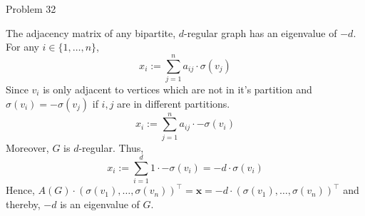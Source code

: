 \documentclass[a4paper]{article}
\begin{document}
\begin{solution}{Problem 32}
\begin{theorem}{The adjacency matrix of any bipartite, $d$-regular graph has an eigenvalue of $-d$.}
For any $i \in \{1, \dots, n\}$,
\begin{equation*}
	x_i := \sum_{j=1}^n a_{ij} \cdot \sigma(v_j)
\end{equation*}
Since $v_i$ is only adjacent to vertices which are not in it's partition and $\sigma(v_i) = -\sigma(v_j)$ if $i, j$ are in different partitions.
\begin{equation*}
	x_i := \sum_{j=1}^n a_{ij} \cdot -\sigma(v_i)
\end{equation*}
Moreover, $G$ is $d$-regular. Thus,
\begin{equation*}
	x_i :=  \sum_{i=1}^d 1 \cdot -\sigma(v_i) = -d \cdot \sigma(v_i) 
\end{equation*}
Hence, $A(G) \cdot (\sigma(v_1), \dots, \sigma(v_n))^\top = \mathbf{x} = -d \cdot (\sigma(v_1) , \dots, \sigma(v_n) )^\top$ and thereby, $-d$ is an eigenvalue of $G$.
		\end{theorem}
	\end{solution}
\end{document}
